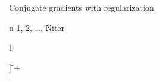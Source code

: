 \begin{algorithm}{Conjugate gradients with regularization}
\begin{FOR}{n \= 1, 2, \ldots, Niter}
\begin{array}{l}
            \end{array}\right] \=
         + \alpha\,
         \\
        \hat{\rho} \= \rho
    \end{FOR} \\
    \RETURN {}
\end{algorithm}




